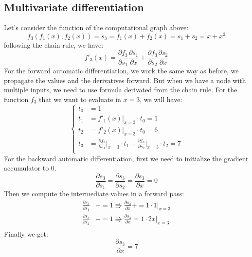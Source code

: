 \documentclass[12pt, openany]{report}
\theoremstyle{definition}
\begin{document}
\subsection{Multivariate differentiation}
Let's consider the function of the computational graph above:
\begin{equation}
  f_3(f_1(x),f_2(x)) = s_3 = f_1(x) + f_2(x) = s_1 + s_2 = x + x^2 
\end{equation}
following the chain rule, we have:
\begin{equation}
  f'_3(x) = \frac{\partial f_3}{\partial s_1} \frac{\partial s_1}{\partial x} + \frac{\partial f_3}{\partial s_2} \frac{\partial s_2}{\partial x}
\end{equation}
For the forward automatic differentiation, we work the same way as before, we propagate the values and the derivatives forward. But when we have a node with multiple inputs, we need to use formula derivated from the chain rule. For the function $f_3$ that we want to evaluate in $x=3$, we will have:
\begin{equation}
	\begin{cases}
		t_0 &= 1 \\
		t_1 &= f'_1(x) \vert_{x=3} \cdot t_0 = 1\\
		t_2 &= f'_2(x) \vert_{x=3} \cdot t_0 = 6\\
		t_3 &= \frac{\partial f_3}{\partial s_1} \vert_{x=3} \cdot t_1 + \frac{\partial f_3}{\partial s_2} \vert_{x=3} \cdot t_2 = 7\\
	\end{cases}
\end{equation}
For the backward automatic differentiation, first we need to initialize the gradient accumulator to 0.
\begin{equation}
	\frac{\partial s_3}{\partial s_1} = \frac{\partial s_3}{\partial s_2} = \frac{\partial s_3}{\partial x} = 0
\end{equation}
Then we compute the intermediate values in a forward pass:
\begin{equation}
	\begin{aligned}
		\frac{\partial s_3}{\partial s_1} &+= 1 \Rrightarrow \frac{\partial s_3}{\partial x} += 1 \cdot 1 \vert_{x=3}\\		
		\frac{\partial s_3}{\partial s_2} &+= 1 \Rrightarrow \frac{\partial s_3}{\partial x} = 1 \cdot 2x \vert_{x=3}\\
	\end{aligned}
\end{equation}
Finally we get:
\begin{equation}
	\frac{\partial s_3}{\partial x} = 7
\end{equation}
\end{document}
